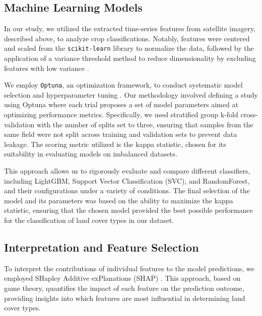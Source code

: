 \documentclass[journal]{IEEEtran}
\begin{document}
\subsection{Machine Learning Models}

In our study, we utilized the extracted time-series features from satellite imagery, described above, to analyze crop classifications.  Notably, features were centered and scaled from the \texttt{scikit-learn} library to normalize the data, followed by the application of a variance threshold method to reduce dimensionality by excluding features with low variance \cite{scikit-learn}.

We employ \texttt{Optuna}, an optimization framework, to conduct systematic model selection and hyperparameter tuning \cite{optuna_2019}. Our methodology involved defining a study using Optuna where each trial proposes a set of model parameters aimed at optimizing performance metrics. Specifically, we used stratified group k-fold cross-validation with the number of splits set to three, ensuring that samples from the same field were not split across training and validation sets to prevent data leakage. The scoring metric utilized is the kappa statistic, chosen for its suitability in evaluating models on imbalanced datasets.

This approach allows us to rigorously evaluate and compare different classifiers, including LightGBM, Support Vector Classification (SVC), and RandomForest, and their configurations under a variety of conditions. The final selection of the model and its parameters was based on the ability to maximize the kappa statistic, ensuring that the chosen model provided the best possible performance for the classification of land cover types in our dataset.

\subsection{Interpretation and Feature Selection}

To interpret the contributions of individual features to the model predictions, we employed SHapley Additive exPlanations (SHAP) \cite{shaps_2017}. This approach, based on game theory, quantifies the impact of each feature on the prediction outcome, providing insights into which features are most influential in determining land cover types.
\end{document}
